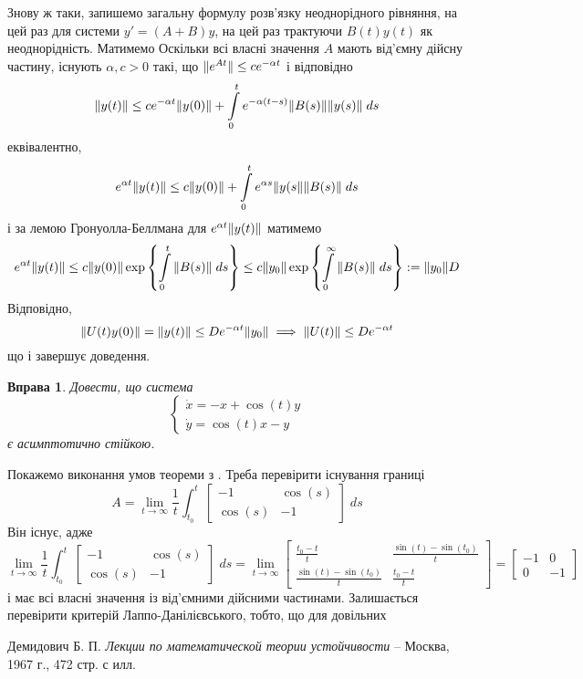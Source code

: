 \documentclass[12pt]{article} %
\newtheorem{prob}{Вправа}
\begin{document}
Знову ж таки, запишемо загальну формулу розв’язку неоднорідного рівняння, на цей раз для системи $y'=(A+B)y$, на цей раз трактуючи $B(t)y(t)$ як
неоднорідність. Матимемо
Оскільки всі власні значення $A$ мають від’ємну дійсну частину, існують $\alpha,c>0$ такі, що $\|e^{At}\|\leq ce^{-\alpha t}$ і відповідно
\[\mynorm{y(t)}\leq ce^{-\alpha t}\mynorm{y(0)}+\int_0^te^{-\alpha(t-s)}\mynorm{B(s)}\mynorm{y(s)}\;ds\]
еквівалентно,
\[e^{\alpha t}\mynorm{y(t)}\leq c\mynorm{y(0)}+\int_0^te^{\alpha s}\mynorm{y(s}\mynorm{B(s)}\;ds\]
і за лемою Гронуолла-Беллмана для $e^{\alpha t}\|y(t)\|$ матимемо
\[e^{\alpha t}\mynorm{y(t)}\leq c\mynorm{y(0)}\exp\mycbra{\int_0^t\mynorm{B(s)}\;ds}\leq c\mynorm{y_0}\exp\mycbra{\int_0^{\infty}\mynorm{B(s)}\;ds}
:=\mynorm{y_0}D\]
Відповідно,
\[\|U(t)y(0)\|=\|y(t)\|\leq De^{-\alpha t}\|y_0\|\implies\|U(t)\|\leq De^{-\alpha t}\]
що і завершує доведення.
\begin{prob}Довести, що система \[\begin{cases}\dot{x}=-x+\cos(t)y\\\dot{y}=\cos(t)x-y\end{cases}\]є асимптотично стійкою.\end{prob}
Покажемо виконання умов теореми з \cite[\S13]{demidovich}. Треба перевірити існування границі
\[A=\lim_{t\to\infty}\frac{1}{t}\int_{t_0}^t\begin{bmatrix}-1&\cos(s)\\\cos(s)&-1\end{bmatrix}\;ds\]
Він існує, адже
\[\lim_{t\to\infty}\frac{1}{t}\int_{t_0}^t\begin{bmatrix}-1&\cos(s)\\\cos(s)&-1\end{bmatrix}\;ds=\lim_{t\to\infty}\begin{bmatrix}
	\frac{t_0-t}{t}&\frac{\sin(t)-\sin(t_0)}{t}\\\frac{\sin(t)-\sin(t_0)}{t}&\frac{t_0-t}{t}\end{bmatrix}=\begin{bmatrix}-1&0\\0&-1\end{bmatrix}
		\]
і має всі власні значення із від’ємними дійсними частинами. Залишається перевірити критерій Лаппо-Данілієвського, тобто, що для довільних
\begin{thebibliography}{9}
Демидович Б. П. \emph{Лекции по математической теории устойчивости} --
Москва, 1967 г., 472 стр. с илл.
\end{thebibliography}
\end{document}
